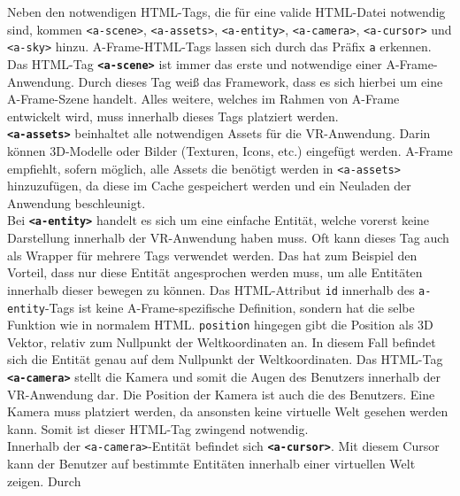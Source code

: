 \documentclass[a4paper,12pt,oneside]{article}
\begin{document}
        Neben den notwendigen HTML-Tags, die für eine valide HTML-Datei
        notwendig sind, kommen \texttt{<a-scene>}, \texttt{<a-assets>},
        \texttt{<a-entity>}, \texttt{<a-camera>}, \texttt{<a-cursor>}
        und \texttt{<a-sky>} hinzu. A-Frame-HTML-Tags lassen sich durch
        das Präfix \texttt{a} erkennen. \\
        Das HTML-Tag \texttt{\textbf{<a-scene>}} ist immer das erste und notwendige
        einer A-Frame-Anwendung. Durch dieses Tag weiß das Framework, 
        dass es sich hierbei um eine A-Frame-Szene handelt. Alles weitere,
        welches im Rahmen von A-Frame entwickelt wird, muss innerhalb
        dieses Tags platziert werden. \\
        \texttt{\textbf{<a-assets>}} beinhaltet alle notwendigen Assets für die 
        VR-Anwendung. Darin können 3D-Modelle oder 
        Bilder (Texturen, Icons, etc.) eingefügt werden. A-Frame empfiehlt,
        sofern möglich, alle Assets die benötigt werden in \texttt{<a-assets>}
        hinzuzufügen, da diese im Cache gespeichert werden und ein Neuladen
        der Anwendung beschleunigt. \\
        Bei \texttt{\textbf{<a-entity>}} handelt es sich um eine einfache Entität,
        welche vorerst keine Darstellung innerhalb der VR-Anwendung haben
        muss. Oft kann dieses Tag auch als Wrapper für mehrere Tags verwendet
        werden. Das hat zum Beispiel den Vorteil, dass nur diese Entität
        angesprochen werden muss, um alle Entitäten innerhalb dieser bewegen
        zu können. Das HTML-Attribut \texttt{id} innerhalb des 
        \texttt{a-entity}-Tags ist keine A-Frame-spezifische Definition,
        sondern hat die selbe Funktion wie in normalem HTML.
        \texttt{position} hingegen gibt die Position als 3D Vektor, 
        relativ zum Nullpunkt der Weltkoordinaten an. In diesem Fall befindet
        sich die Entität genau auf dem Nullpunkt der Weltkoordinaten.
        Das HTML-Tag \texttt{\textbf{<a-camera>}} stellt die Kamera und
        somit die Augen des Benutzers innerhalb der VR-Anwendung dar. Die
        Position der Kamera ist auch die des Benutzers. Eine Kamera
        muss platziert werden, da ansonsten keine virtuelle Welt gesehen
        werden kann. Somit ist dieser HTML-Tag zwingend notwendig. \\
        Innerhalb der \texttt{<a-camera>}-Entität befindet sich 
        \texttt{\textbf{<a-cursor>}}. Mit diesem Cursor kann der Benutzer
        auf bestimmte Entitäten innerhalb einer virtuellen Welt zeigen. Durch
\end{document}

